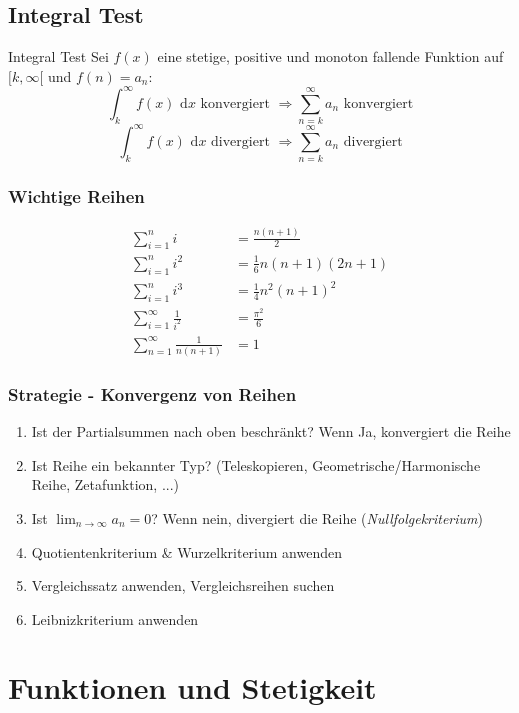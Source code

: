 \documentclass[a4paper,8pt]{extarticle}
\def\limn{\lim_{n\to \infty}}
\def\dx{\text{ d}x}
\begin{document}
\subsection{Integral Test}
\begin{mainbox}{Integral Test}
  Sei $f(x)$ eine stetige, positive und monoton fallende Funktion auf $[k, \infty[$ und $f(n) = a_n$:
  $$\int_k^\infty f(x)\dx \text{ konvergiert } \Rightarrow \sum_{n = k}^\infty a_n \text{ konvergiert}$$$$\int_k^\infty f(x)\dx \text{ divergiert } \Rightarrow \sum_{n = k}^\infty a_n \text{ divergiert}$$
\end{mainbox}

\subsubsection{Wichtige Reihen}
\begin{align*}
 \sum_{i=1}^n i &= \frac{n(n+1)}{2} \\
 \sum_{i=1}^n i^2 &= \frac{1}{6}n(n+1)(2n+1) \\
 \sum_{i=1}^n i^3 &= \frac{1}{4}n^2(n+1)^2 \\
 \sum_{i=1}^\infty \frac{1}{i^2} &= \frac{\pi^2}{6} \\
 \sum_{n=1}^\infty \frac{1}{n(n+1)} &= 1
\end{align*}

\subsubsection{Strategie - Konvergenz von Reihen}
\begin{enumerate}
  \item Ist der Partialsummen nach oben beschränkt? Wenn Ja, konvergiert die Reihe
 \item Ist Reihe ein bekannter Typ? (Teleskopieren, Geometrische/Harmonische Reihe, Zetafunktion, ...)
 \item Ist $\limn a_n = 0$? Wenn nein, divergiert die Reihe (\textit{Nullfolgekriterium})
 \item Quotientenkriterium \& Wurzelkriterium anwenden
 \item Vergleichssatz anwenden, Vergleichsreihen suchen
 \item Leibnizkriterium anwenden
\end{enumerate}

\section{Funktionen und Stetigkeit}
\end{document}
